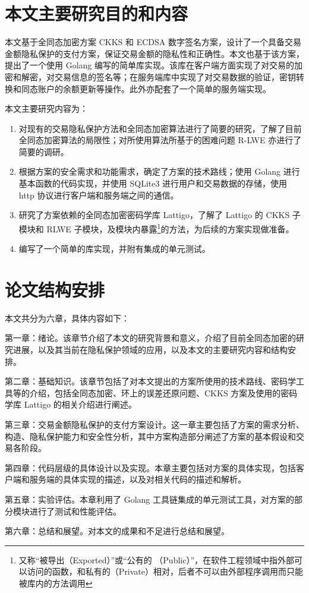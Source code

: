 \section{本文主要研究目的和内容}

本文基于全同态加密方案 CKKS\cite{cryptoeprint:2016/421} 和 ECDSA 数字签名方案，设计了一个具备交易金额隐私保护的支付方案，保证交易金额的隐私性和正确性。本文也基于该方案，提出了一个使用 Golang 编写的简单库实现。该库在客户端方面实现了对交易的加密和解密，对交易信息的签名等；在服务端库中实现了对交易数据的验证，密钥转换和同态账户的余额更新等操作。此外亦配套了一个简单的服务端实现。

本文主要研究内容为：

\begin{enumerate}
    \item 对现有的交易隐私保护方法和全同态加密算法进行了简要的研究，了解了目前全同态加密算法的局限性；对所使用算法所基于的困难问题 R-LWE 亦进行了简要的调研。
    \item 根据方案的安全需求和功能需求，确定了方案的技术路线；使用 Golang 进行基本函数的代码实现，并使用 SQLite3 进行用户和交易数据的存储，使用 http 协议进行客户端和服务端之间的通信。
    \item 研究了方案依赖的全同态加密密码学库 Lattigo\cite{lattigoRepo}，了解了 Lattigo 的 CKKS 子模块和 RLWE 子模块，及模块内暴露\footnote{又称“被导出（Exported）”或“公有的 （Public）”，在软件工程领域中指外部可以访问的函数，和私有的（Private）相对，后者不可以由外部程序调用而只能被库内的方法调用}的方法，为后续的方案实现做准备。
    \item 编写了一个简单的库实现，并附有集成的单元测试。
\end{enumerate}

\section{论文结构安排}

本文共分为六章，具体内容如下：

第一章：绪论。该章节介绍了本文的研究背景和意义，介绍了目前全同态加密的研究进展，以及其当前在隐私保护领域的应用，以及本文的主要研究内容和结构安排。

第二章：基础知识。该章节包括了对本文提出的方案所使用的技术路线、密码学工具等的介绍，包括全同态加密、环上的误差还原问题、CKKS 方案及使用的密码学库 Lattigo 的相关介绍进行阐述。

第三章：交易金额隐私保护的支付方案设计。这一章主要包括了方案的需求分析、构造、隐私保护能力和安全性分析，其中方案构造部分阐述了方案的基本假设和交易各阶段。

第四章：代码层级的具体设计以及实现。本章主要包括对方案的具体实现，包括客户端和服务端的具体实现的描述，以及对相关代码的描述和解析。

第五章：实验评估。本章利用了 Golang 工具链集成的单元测试工具，对方案的部分模块进行了测试和性能评估。

第六章：总结和展望。对本文的成果和不足进行总结和展望。
